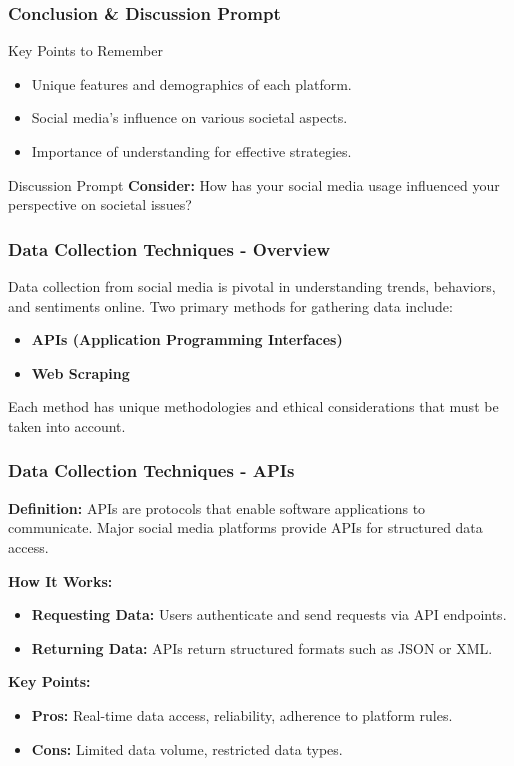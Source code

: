\documentclass{beamer}
\begin{document}
\begin{frame}[fragile]
    \frametitle{Conclusion \& Discussion Prompt}
    \begin{block}{Key Points to Remember}
        \begin{itemize}
            \item Unique features and demographics of each platform.
            \item Social media's influence on various societal aspects.
            \item Importance of understanding for effective strategies.
        \end{itemize}
    \end{block}
    \begin{block}{Discussion Prompt}
        \textbf{Consider:} How has your social media usage influenced your perspective on societal issues?
    \end{block}
\end{frame}

\begin{frame}[fragile]
    \frametitle{Data Collection Techniques - Overview}
    Data collection from social media is pivotal in understanding trends, behaviors, and sentiments online. 
    Two primary methods for gathering data include:
    
    \begin{itemize}
        \item \textbf{APIs (Application Programming Interfaces)}
        \item \textbf{Web Scraping}
    \end{itemize}
    
    Each method has unique methodologies and ethical considerations that must be taken into account.
\end{frame}

\begin{frame}[fragile]
    \frametitle{Data Collection Techniques - APIs}
    
    \textbf{Definition:} APIs are protocols that enable software applications to communicate. Major social media platforms provide APIs for structured data access.
    
    \textbf{How It Works:}
    \begin{itemize}
        \item \textbf{Requesting Data:} Users authenticate and send requests via API endpoints.
        \item \textbf{Returning Data:} APIs return structured formats such as JSON or XML.
    \end{itemize}

    \textbf{Key Points:}
    \begin{itemize}
        \item \textbf{Pros:} Real-time data access, reliability, adherence to platform rules.
        \item \textbf{Cons:} Limited data volume, restricted data types.
    \end{itemize}
\end{frame}
\end{document}
